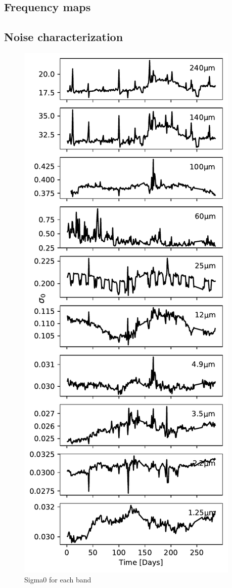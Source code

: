 \documentclass{aa}
\begin{document}
\subsection{Frequency maps}



\subsection{Noise characterization}

\begin{figure}
	\centering
	\includegraphics[width=\columnwidth]{figs/sigma0_bands.pdf}
	\caption{Sigma0 for each band}
	\label{fig:sigma0}
\end{figure}
\end{document}
